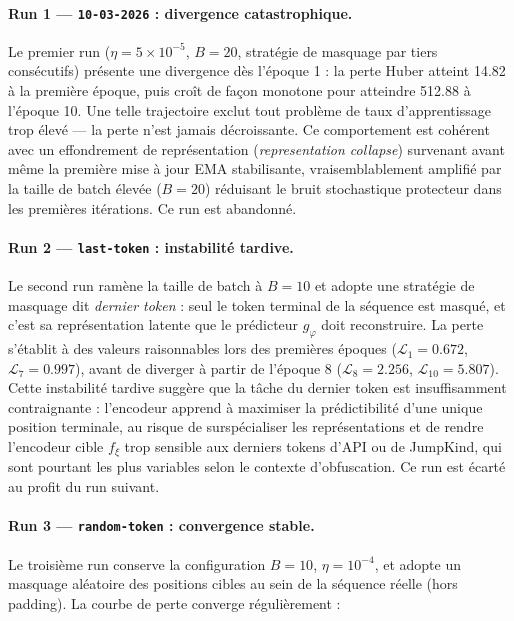 \paragraph{Run 1 — \texttt{10-03-2026} : divergence catastrophique.}
Le premier run ($\eta = 5 \times 10^{-5}$, $B = 20$, stratégie de masquage par tiers
consécutifs) présente une divergence dès l'époque 1 : la perte Huber atteint 14.82 à la
première époque, puis croît de façon monotone pour atteindre 512.88 à l'époque 10.
Une telle trajectoire exclut tout problème de taux d'apprentissage trop élevé — la perte
n'est jamais décroissante. Ce comportement est cohérent avec un effondrement de
représentation (\textit{representation collapse}) survenant avant même la première mise à
jour EMA stabilisante, vraisemblablement amplifié par la taille de batch élevée ($B=20$)
réduisant le bruit stochastique protecteur dans les premières itérations. Ce run est
abandonné.

\paragraph{Run 2 — \texttt{last-token} : instabilité tardive.}
Le second run ramène la taille de batch à $B = 10$ et adopte une stratégie de masquage
dit \textit{dernier token} : seul le token terminal de la séquence est masqué, et c'est
sa représentation latente que le prédicteur $g_\varphi$ doit reconstruire. La perte
s'établit à des valeurs raisonnables lors des premières époques
($\mathcal{L}_1 = 0.672$, $\mathcal{L}_7 = 0.997$), avant de diverger à partir de
l'époque 8 ($\mathcal{L}_8 = 2.256$, $\mathcal{L}_{10} = 5.807$). Cette instabilité
tardive suggère que la tâche du dernier token est insuffisamment contraignante :
l'encodeur apprend à maximiser la prédictibilité d'une unique position terminale,
au risque de surspécialiser les représentations et de rendre l'encodeur cible $f_\xi$
trop sensible aux derniers tokens d'API ou de JumpKind, qui sont pourtant les plus
variables selon le contexte d'obfuscation. Ce run est écarté au profit du run suivant.

\paragraph{Run 3 — \texttt{random-token} : convergence stable.}
Le troisième run conserve la configuration $B = 10$, $\eta = 10^{-4}$, et adopte un
masquage aléatoire des positions cibles au sein de la séquence réelle (hors padding).
La courbe de perte converge régulièrement :

